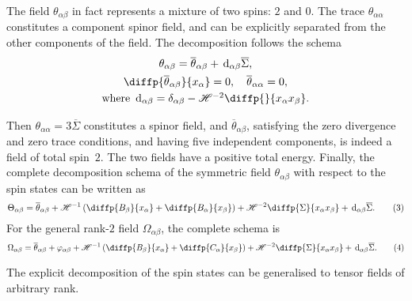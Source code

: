 \documentclass{article}
\newcommand{\HH}{\mathscr{H}}
\renewcommand{\d}{\,\mathrm{d}}
\newcommand{\oldpage}[1]{\marginpar{\footnotesize$\Big\vert$ \textit{p.~#1}}}
\begin{document}
\medskip\hrulefill\bigskip

The field $\theta_{\alpha\beta}$ in fact represents a mixture of two spins: $2$ and $0$.
The trace $\theta_{\alpha\alpha}$ constitutes a component spinor field, and can be explicitly separated from the other components of the field.
The decomposition follows the schema
\begin{gather*}
  \theta_{\alpha\beta} = \overline{\theta}_{\alpha\beta} + \d_{\alpha\beta}\overline{\Sigma},
\\\diffp{{\overline{\theta}_{\alpha\beta}}}{{x_\alpha}} = 0,
  \quad \overline{\theta}_{\alpha\alpha} = 0,
\\\mbox{where $\d_{\alpha\beta}=\delta_{\alpha\beta}-\HH^{-2}\diffp{}{{x_\alpha}{x_\beta}}$.}
\end{gather*}

Then $\theta_{\alpha\alpha}=3\overline{\Sigma}$ constitutes a spinor field, and $\overline{\theta}_{\alpha\beta}$, satisfying the zero divergence and zero trace conditions, and having five independent components, is indeed a field of total spin~$2$.
The two fields have a positive total energy.
Finally, the complete decomposition schema of the symmetric field $\theta_{\alpha\beta}$ with respect to the spin states can be written as
\oldpage{13-05}
\[
\label{equation3}
  \Theta_{\alpha\beta} = \overline{\theta}_{\alpha\beta} + \HH^{-1}\left(
    \diffp{{B_\beta}}{{x_\alpha}} + \diffp{{B_\alpha}}{{x_\beta}}
  \right) + \HH^{-2} \diffp{\Sigma}{{x_\alpha}{x_\beta}} + \d_{\alpha\beta}\overline{\Sigma}.
  \tag{3}
\]
For the general rank-$2$ field $\Omega_{\alpha\beta}$, the complete schema is
\[
\label{equation4}
  \Omega_{\alpha\beta} = \overline{\theta}_{\alpha\beta} + \varphi_{\alpha\beta} + \HH^{-1}\left(
    \diffp{{B_\beta}}{{x_\alpha}} + \diffp{{C_\alpha}}{{x_\beta}}
  \right) + \HH^{-2} \diffp{\Sigma}{{x_\alpha}{x_\beta}} + \d_{\alpha\beta}\overline{\Sigma}.
  \tag{4}
\]

The explicit decomposition of the spin states can be generalised to tensor fields of arbitrary rank.

\medskip\hrulefill\bigskip
\end{document}
